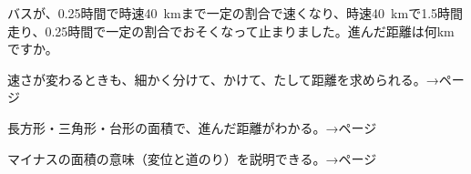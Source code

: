\bkproblem バスが、0.25時間で時速\qty{40}{km}まで一定の割合で速くなり、時速\qty{40}{km}で1.5時間走り、0.25時間で一定の割合でおそくなって止まりました。進んだ距離は何kmですか。

\begin{furikaeri}
\begin{checklist}
\item 速さが変わるときも、細かく分けて、かけて、たして距離を求められる。\hfill{\footnotesize\sffamily\color{bkTheme}→\pageref{bk:5-9:wakeru}ページ}
\item 長方形・三角形・台形の面積で、進んだ距離がわかる。\hfill{\footnotesize\sffamily\color{bkTheme}\mbox{→\pageref{bk:5-9:sankaku}ページ}}
\item マイナスの面積の意味（変位と道のり）を説明できる。\hfill{\footnotesize\sffamily\color{bkTheme}→\pageref{bk:5-9:minus}ページ}
\end{checklist}
\end{furikaeri}


